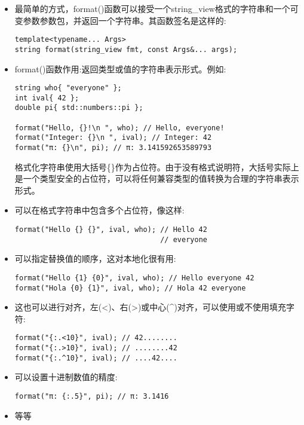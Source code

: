 \begin{itemize}
\item 
最简单的方式，format()函数可以接受一个string\_view格式的字符串和一个可变参数参数包，并返回一个字符串。其函数签名是这样的:

\begin{lstlisting}[style=styleCXX]
template<typename... Args>
string format(string_view fmt, const Args&... args);
\end{lstlisting}

\item 
format()函数作用:返回类型或值的字符串表示形式。例如:

\begin{lstlisting}[style=styleCXX]
string who{ "everyone" };
int ival{ 42 };
double pi{ std::numbers::pi };

format("Hello, {}!\n ", who); // Hello, everyone!
format("Integer: {}\n ", ival); // Integer: 42
format("π: {}\n", pi); // π: 3.141592653589793
\end{lstlisting}

格式化字符串使用大括号\{\}作为占位符。由于没有格式说明符，大括号实际上是一个类型安全的占位符，可以将任何兼容类型的值转换为合理的字符串表示形式。

\item 
可以在格式字符串中包含多个占位符，像这样:

\begin{lstlisting}[style=styleCXX]
format("Hello {} {}", ival, who); // Hello 42
								  // everyone
\end{lstlisting}

\item 
可以指定替换值的顺序，这对本地化很有用:

\begin{lstlisting}[style=styleCXX]
format("Hello {1} {0}", ival, who); // Hello everyone 42
format("Hola {0} {1}", ival, who); // Hola 42 everyone
\end{lstlisting}

\item 
这也可以进行对齐，左(<)、右(>)或中心(\^{})对齐，可以使用或不使用填充字符:

\begin{lstlisting}[style=styleCXX]
format("{:.<10}", ival); // 42........
format("{:.>10}", ival); // ........42
format("{:.^10}", ival); // ....42....
\end{lstlisting}

\item 
可以设置十进制数值的精度:

\begin{lstlisting}[style=styleCXX]
format("π: {:.5}", pi); // π: 3.1416
\end{lstlisting}

\item 
等等
\end{itemize}

